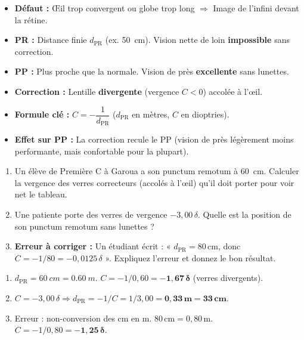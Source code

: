 \documentclass[11pt]{article}
\begin{document}
\begin{aretenir}
\begin{itemize}
    \item \textbf{Défaut :} Œil trop convergent ou globe trop long $\Rightarrow$ Image de l'infini devant la rétine.
    \item \textbf{PR :} Distance finie $d_{\text{PR}}$ (ex. \SI{50}{cm}). Vision nette de loin \textbf{impossible} sans correction.
    \item \textbf{PP :} Plus proche que la normale. Vision de près \textbf{excellente} sans lunettes.
    \item \textbf{Correction :} Lentille \textbf{divergente} (vergence $C < 0$) accolée à l'œil.
    \item \textbf{Formule clé :} $\boxed{C = -\dfrac{1}{d_{\text{PR}}}}$ ($d_{\text{PR}}$ en mètres, $C$ en dioptries).
    \item \textbf{Effet sur PP :} La correction recule le PP (vision de près légèrement moins performante, mais confortable pour la plupart).
\end{itemize}
\end{aretenir}

\begin{exercice}
\begin{enumerate}
    \item Un élève de Première C à Garoua a son punctum remotum à \SI{60}{cm}. Calculer la vergence des verres correcteurs (accolés à l'œil) qu'il doit porter pour voir net le tableau.
    \item Une patiente porte des verres de vergence $-3,00\,\delta$. Quelle est la position de son punctum remotum sans lunettes ?
    \item \textbf{Erreur à corriger :} Un étudiant écrit : « $d_{\text{PR}} = 80\,\text{cm}$, donc $C = -1/80 = -0,0125\,\delta$ ». Expliquez l'erreur et donnez le bon résultat.
\end{enumerate}
\end{exercice}

\begin{corrige}[Exercice n]
\begin{enumerate}
    \item $d_{\text{PR}} = \SI{60}{cm} = \SI{0,60}{m}$. $C = -1/0,60 = \mathbf{-1,67\,\delta}$ (verres divergents).
    \item $C = -3,00\,\delta \Rightarrow d_{\text{PR}} = -1/C = 1/3,00 = \mathbf{0,33\,m = 33\,cm}$.
    \item Erreur : non-conversion des cm en m. $80\,\text{cm} = 0,80\,\text{m}$. $C = -1/0,80 = \mathbf{-1,25\,\delta}$.
\end{enumerate}
\end{corrige}
\end{document}
